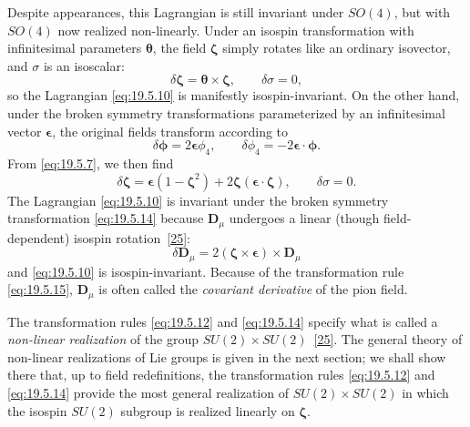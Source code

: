 Despite appearances, this Lagrangian is still invariant under $SO(4)$, but with $SO(4)$ now realized non-linearly. Under an isospin transformation with infinitesimal parameters $\boldsymbol{\theta}$, the field $\boldsymbol{\zeta}$ simply rotates like an ordinary isovector, and $\sigma$ is an isoscalar:
\begin{equation}
\delta\boldsymbol{\zeta}
=\boldsymbol{\theta}\times\boldsymbol{\zeta},
\qquad
\delta\sigma=0,
\tag{19.5.12}\label{eq:19.5.12}
\end{equation}
so the Lagrangian \eqref{eq:19.5.10} is manifestly isospin-invariant. On the other hand, under the broken symmetry transformations parameterized by an infinitesimal vector $\boldsymbol{\epsilon}$, the original fields transform according to
\begin{equation}
\delta\boldsymbol{\phi}=2\boldsymbol{\epsilon}\phi_4,
\qquad
\delta\phi_4=-2\boldsymbol{\epsilon}\cdot\boldsymbol{\phi}.
\tag{19.5.13}\label{eq:19.5.13}
\end{equation}
From \eqref{eq:19.5.7}, we then find
\begin{equation}
\delta\boldsymbol{\zeta}
=\boldsymbol{\epsilon}(1-\boldsymbol{\zeta}^2)
+2\boldsymbol{\zeta}(\boldsymbol{\epsilon}\cdot\boldsymbol{\zeta}),
\qquad
\delta\sigma=0.
\tag{19.5.14}\label{eq:19.5.14}
\end{equation}
The Lagrangian \eqref{eq:19.5.10} is invariant under the broken symmetry transformation \eqref{eq:19.5.14} because $\boldsymbol D_\mu$ undergoes a linear (though field-dependent) isospin rotation~\hyperref[ch19-ref-25]{[25]}:
\begin{equation}
\delta\boldsymbol D_\mu
=2(\boldsymbol{\zeta}\times\boldsymbol{\epsilon})
\times\boldsymbol D_\mu
\tag{19.5.15}\label{eq:19.5.15}
\end{equation}
and \eqref{eq:19.5.10} is isospin-invariant. Because of the transformation rule \eqref{eq:19.5.15}, $\boldsymbol D_\mu$ is often called the \emph{covariant derivative} of the pion field.

The transformation rules \eqref{eq:19.5.12} and \eqref{eq:19.5.14} specify what is called a \emph{non-linear realization} of the group $SU(2)\times SU(2)$~\hyperref[ch19-ref-25]{[25]}. The general theory of non-linear realizations of Lie groups is given in the next section; we shall show there that, up to field redefinitions, the transformation rules \eqref{eq:19.5.12} and \eqref{eq:19.5.14} provide the most general realization of $SU(2)\times SU(2)$ in which the isospin $SU(2)$ subgroup is realized linearly on $\boldsymbol{\zeta}$.

